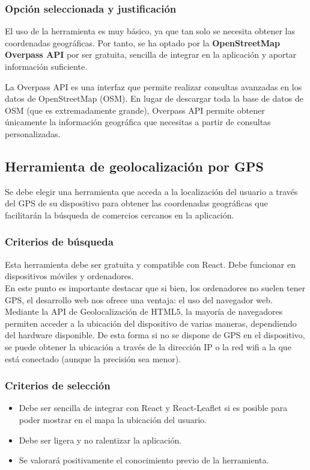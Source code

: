 \subsubsection{Opción seleccionada y justificación}
El uso de la herramienta es muy básico, ya que tan solo se necesita obtener las coordenadas geográficas. Por tanto, se ha optado por la \textbf{OpenStreetMap Overpass API} por ser gratuita, sencilla de integrar en la aplicación y aportar información suficiente.

La Overpass API es una interfaz que permite realizar consultas avanzadas en los datos de OpenStreetMap (OSM). En lugar de descargar toda la base de datos de OSM (que es extremadamente grande), Overpass API permite obtener únicamente la información geográfica que necesitas a partir de consultas personalizadas\cite{overpassAPI2023}.


\subsection{Herramienta de geolocalización por GPS}
Se debe elegir una herramienta que acceda a la localización del usuario a través del GPS de su dispositivo para obtener las coordenadas geográficas que facilitarán la búsqueda de comercios cercanos en la aplicación. 

\subsubsection{Criterios de búsqueda}
Esta herramienta debe ser gratuita y compatible con React. Debe funcionar en dispositivos móviles y ordenadores. \\

En este punto es importante destacar que si bien, los ordenadores no suelen tener GPS, el desarrollo web nos ofrece una ventaja: el uso del navegador web. Mediante la API de Geolocalización de HTML5, la mayoría de navegadores permiten acceder a la ubicación del dispositivo de varias maneras, dependiendo del hardware disponible. De esta forma si no se dispone de GPS en el dispositivo, se puede obtener la ubicación a través de la dirección IP o la red wifi a la que está conectado (aunque la precisión sea menor).

\subsubsection{Criterios de selección}
\begin{itemize}
    \item Debe ser sencilla de integrar con React y React-Leaflet si es posible para poder mostrar en el mapa la ubicación del usuario.
    \item Debe ser ligera y no ralentizar la aplicación.
    \item Se valorará positivamente el conocimiento previo de la herramienta. 
\end{itemize}

